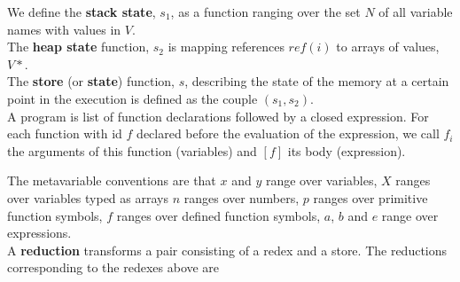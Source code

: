\documentclass[12pt,a4paper,titlepage]{article}
\begin{document}
We define the \textbf{stack state}, $s_1$, as a function ranging over the set $N$ of all variable names with values in $V$.\\

The \textbf{heap state} function, $s_2$ is mapping references $ref(i)$ to arrays of values, $V*$.\\

The \textbf{store} (or \textbf{state}) function, $s$, describing the state of the memory at a certain point in the execution is defined as the couple $(s_1, s_2)$.\\

A program is list of function declarations followed by a closed expression. For each function with id $f$ declared before the evaluation of the expression, we call $f_i$ the arguments of this function (variables) and $[f]$ its body (expression).

The metavariable conventions are that $x$ and $y$ range over variables, $X$ ranges over variables typed as arrays $n$ ranges over numbers, $p$ ranges over primitive function symbols, $f$ ranges over defined function symbols, $a$, $b$ and $e$ range over expressions. \\

A \textbf{reduction} transforms a pair consisting of a redex and a store. The reductions corresponding to the redexes above are
\end{document}
